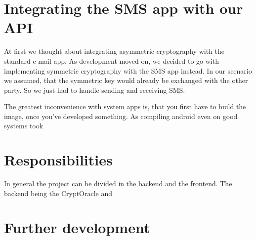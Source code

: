 \documentclass[a4paper,draft]{scrartcl}
\begin{document}
\section{Integrating the SMS app with our API}
	\label{sec-sms-app}
	At first we thought about integrating asymmetric cryptography with the standard e-mail app. As development moved on, we decided to go with implementing symmetric cryptography with the SMS app instead. In our scenario we assumed, that the symmetric key would already be exchanged with the other party. So we just had to handle sending and receiving SMS.
	
	The greatest inconvenience with system apps is, that you first have to build the image, once you've developed something. As compiling android even on good systems took
	
\section{Responsibilities}
	In general the project can be divided in the backend and the frontend. The backend being the CryptOracle and 
	
\section{Further development}
\end{document}
